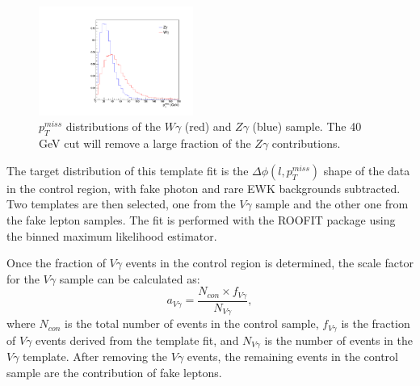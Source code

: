\documentclass[thesis.tex]{subfiles}
\renewcommand\_{\textunderscore\allowbreak}
\begin{document}
\begin{figure}[hbtp]
  \centering
    \includegraphics[width=0.45\textwidth]{Figures/dphiTemplate_MET.pdf}
  \caption{$p_T^{miss}$ distributions of the $W\gamma$ (red) and $Z\gamma$ (blue) sample. The 40 GeV cut will remove a large fraction of the $Z\gamma$ contributions.}
    \label{fig:WGZG_met}
\end{figure}

The target distribution of this template fit is the $\Delta\phi(l,p_{T}^{miss})$ shape of the data in the control region, with fake photon and rare EWK backgrounds subtracted. Two templates are then selected, one from the $V\gamma$ sample and the other one from the fake lepton samples. The fit is performed with the ROOFIT package using the binned maximum likelihood estimator.

Once the fraction of $V\gamma$ events in the control region is determined, the scale factor for the $V\gamma$ sample can be calculated as: 
\begin{equation}
 		a_{V\gamma} = \frac{N_{con}\times f_{V\gamma}}{N_{V\gamma}}, 
\end{equation}
where $N_{con}$ is the total number of events in the control sample, $f_{V\gamma}$ is the fraction of $V\gamma$ events derived from the template fit, and $N_{V\gamma}$ is the number of events in the $V\gamma$ template. After removing the $V\gamma$ events, the remaining events in the control sample are the contribution of fake leptons. 

\end{document}
